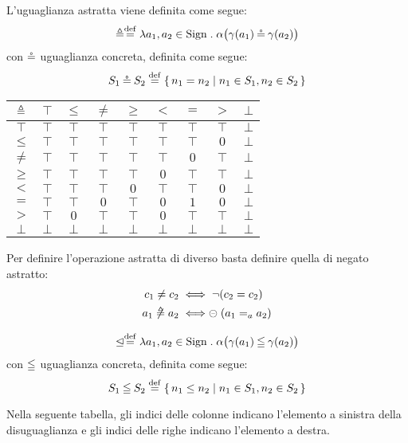 \begin{definizione}
L'uguaglianza astratta viene definita come segue:
\[
        \abseq \defeq \lambda a_1,a_2 \in \Sign \st \alpha\bigl(\gamma(a_1) \coneq \gamma(a_2)\bigr)
\]
con $\mathbin{\circeq}$ uguaglianza concreta, definita come segue:
\[
        S_1 \coneq S_2 \defeq \{\, n_1 = n_2 \mid n_1 \in S_1, n_2 \in S_2 \,\}
\]
\end{definizione}
\begin{center}
        \begin{tabular}{ c | c c c c c c c c }
                $\mathrel{\triangleq}$ & $\top$ & $\leq$ & $\neq$ & $\geq$ & $<$ & $=$ & $>$ & $\bot$ \\
                \hline
                $\top$ & $\top$ & $\top$ & $\top$ & $\top$ & $\top$ & $\top$ & $\top$ & $\bot$ \\
                $\leq$ & $\top$ & $\top$ & $\top$ & $\top$ & $\top$ & $\top$ & $0$ & $\bot$\\
                $\neq$ & $\top$ & $\top$ & $\top$ & $\top$ & $\top$ & $0$ & $\top$ & $\bot$\\
                $\geq$ & $\top$ & $\top$ & $\top$ & $\top$ & $0$ & $\top$ & $\top$ & $\bot$\\
                $<$ & $\top$ & $\top$ & $\top$ & $0$ & $\top$ & $\top$ & $0$ & $\bot$\\
                $=$ & $\top$ & $\top$ & $0$ & $\top$ & $0$ & $1$ & $0$ & $\bot$\\
                $>$ & $\top$ & $0$ & $\top$ & $\top$ & $0$ & $\top$ & $\top$ & $\bot$\\
                $\bot$ & $\bot$ & $\bot$ & $\bot$ & $\bot$ & $\bot$ & $\bot$ & $\bot$ & $\bot$
        \end{tabular}
\end{center}


\begin{definizione}
Per definire l'operazione astratta di diverso basta definire quella di negato astratto:
\begin{align*}
        c_1 \neq c_2 &\iff \neg (c_2 = c_2) \\
        a_1 \mathrel{\not\triangleq} a_2 &\iff \mathrel{\circleddash} (a_1 =_a a_2)
\end{align*}
\end{definizione}

\begin{definizione}
\[
        \absleq \defeq \lambda a_1,a_2 \in \Sign \st \alpha\bigl(\gamma(a_1) \conineq \gamma(a_2)\bigr)
\]
con $\mathbin{\leqq}$ uguaglianza concreta, definita come segue:
\[
        S_1 \conineq S_2 \defeq \{\, n_1 \leq n_2 \mid n_1 \in S_1, n_2 \in S_2 \,\}
\]
\end{definizione}
Nella seguente tabella, gli indici delle colonne indicano
l'elemento a sinistra della disuguaglianza e gli indici delle righe
indicano l'elemento a destra.

